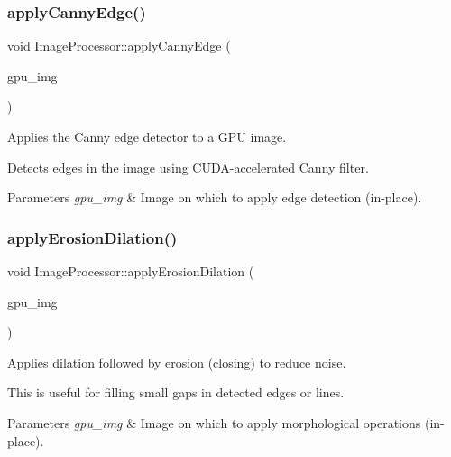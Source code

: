 \subsubsection{\texorpdfstring{apply\+Canny\+Edge()}{applyCannyEdge()}}
{\footnotesize\ttfamily void Image\+Processor\+::apply\+Canny\+Edge (\begin{DoxyParamCaption}\item[{cv\+::cuda\+::\+Gpu\+Mat \&}]{gpu\+\_\+img }\end{DoxyParamCaption})}



Applies the Canny edge detector to a G\+PU image. 

Detects edges in the image using C\+U\+D\+A-\/accelerated Canny filter.


\begin{DoxyParams}{Parameters}
{\em gpu\+\_\+img} & Image on which to apply edge detection (in-\/place). \\
\hline
\end{DoxyParams}
\mbox{\label{classImageProcessor_a358c5380af94e810845282f05579265a}} 
\subsubsection{\texorpdfstring{apply\+Erosion\+Dilation()}{applyErosionDilation()}}
{\footnotesize\ttfamily void Image\+Processor\+::apply\+Erosion\+Dilation (\begin{DoxyParamCaption}\item[{cv\+::cuda\+::\+Gpu\+Mat \&}]{gpu\+\_\+img }\end{DoxyParamCaption})}



Applies dilation followed by erosion (closing) to reduce noise. 

This is useful for filling small gaps in detected edges or lines.


\begin{DoxyParams}{Parameters}
{\em gpu\+\_\+img} & Image on which to apply morphological operations (in-\/place). \\
\hline
\end{DoxyParams}
\mbox{\label{classImageProcessor_a6bce7d61162f71ae9bb322b40c9990ab}} 
